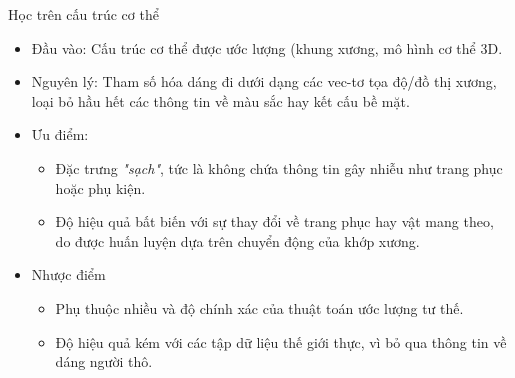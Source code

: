 \begin{frame}{Học trên cấu trúc cơ thể}
    \begin{itemize}
        \item Đầu vào: Cấu trúc cơ thể được ước lượng (khung xương, mô hình cơ thể 3D.%
        \item Nguyên lý: Tham số hóa dáng đi dưới dạng các vec-tơ tọa độ/đồ thị xương, loại bỏ hầu hết các thông tin về màu sắc hay kết cấu bề mặt.
        \item Ưu điểm:
              \begin{itemize}
                  \item Đặc trưng \textit{"sạch"}, tức là không chứa thông tin gây nhiễu như trang phục hoặc phụ kiện.
                  \item Độ hiệu quả bất biến với sự thay đổi về trang phục hay vật mang theo, do được huấn luyện dựa trên chuyển động của khớp xương.
              \end{itemize}
        \item Nhược điểm
              \begin{itemize}
                  \item Phụ thuộc nhiều và độ chính xác của thuật toán ước lượng tư thế.
                  \item Độ hiệu quả kém với các tập dữ liệu thế giới thực, vì bỏ qua thông tin về dáng người thô.
              \end{itemize}
    \end{itemize}
\end{frame}


